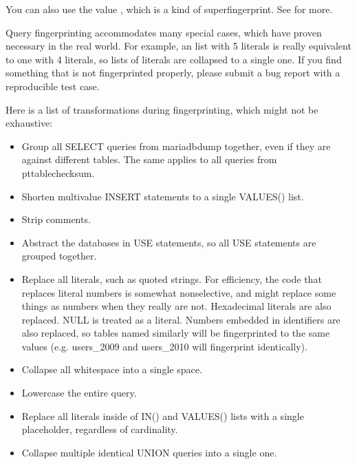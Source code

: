 \documentclass[letterpaper,10pt,english]{sphinxmanual}
\begin{document}
\sphinxAtStartPar
You can also use the value , which is a kind of super\sphinxhyphen{}fingerprint.
See {\hyperref[\detokenize{mariadb-query-digest:cmdoption-mariadb-query-digest-group-by}]{}} for more.

\sphinxAtStartPar
Query fingerprinting accommodates many special cases, which have proven
necessary in the real world.  For example, an  list with 5 literals
is really equivalent to one with 4 literals, so lists of literals are
collapsed to a single one.  If you find something that is not fingerprinted
properly, please submit a bug report with a reproducible test case.

\sphinxAtStartPar
Here is a list of transformations during fingerprinting, which might not
be exhaustive:
\begin{itemize}
\item {} 
\sphinxAtStartPar
Group all SELECT queries from mariadb\sphinxhyphen{}dump together, even if they are against
different tables.  The same applies to all queries from pt\sphinxhyphen{}table\sphinxhyphen{}checksum.

\item {} 
\sphinxAtStartPar
Shorten multi\sphinxhyphen{}value INSERT statements to a single VALUES() list.

\item {} 
\sphinxAtStartPar
Strip comments.

\item {} 
\sphinxAtStartPar
Abstract the databases in USE statements, so all USE statements are grouped
together.

\item {} 
\sphinxAtStartPar
Replace all literals, such as quoted strings.  For efficiency, the code that
replaces literal numbers is somewhat non\sphinxhyphen{}selective, and might replace some
things as numbers when they really are not.  Hexadecimal literals are also
replaced.  NULL is treated as a literal.  Numbers embedded in identifiers are
also replaced, so tables named similarly will be fingerprinted to the same
values (e.g. users\_2009 and users\_2010 will fingerprint identically).

\item {} 
\sphinxAtStartPar
Collapse all whitespace into a single space.

\item {} 
\sphinxAtStartPar
Lowercase the entire query.

\item {} 
\sphinxAtStartPar
Replace all literals inside of IN() and VALUES() lists with a single
placeholder, regardless of cardinality.

\item {} 
\sphinxAtStartPar
Collapse multiple identical UNION queries into a single one.

\end{itemize}
\end{document}
